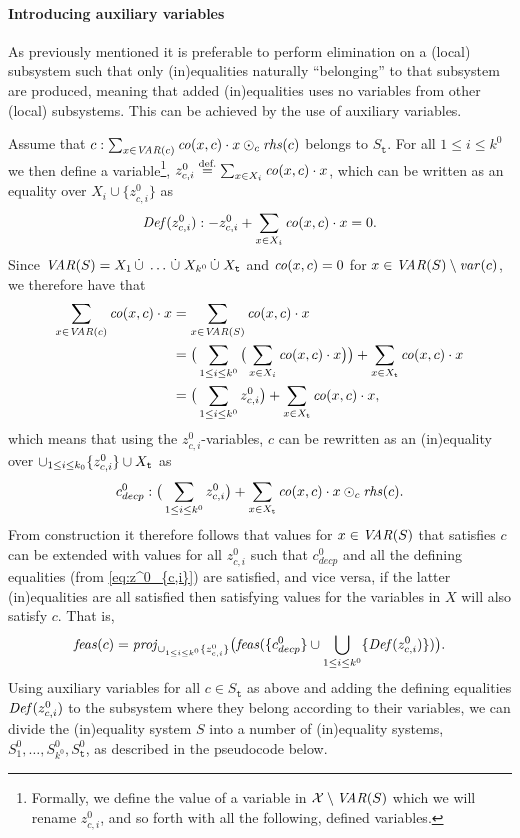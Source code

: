 \paragraph{Introducing auxiliary variables}
As previously mentioned it is preferable to perform elimination on a (local) subsystem such that only (in)equalities naturally ``belonging'' to that subsystem are produced, meaning that added (in)equalities uses no variables from other (local) subsystems. 
This can be achieved by the use of auxiliary variables.

Assume that $c:\sum_{x\in \mathit{VAR}(c)} \mathit{co}(x,c)\cdot x \odot_c \mathit{rhs}(c)$ belongs to $S_\texttt{t}$.  
For all $1\leq i \leq k^0$ we then define a variable\footnote{{Formally, we define the value of a variable in $\mathcal{X}\setminus \mathit{VAR}(S)$ which we will rename $z^0_{c,i}$, and so forth with all the following, defined variables}.}, $z_{c,i}^{0} \overset{\text{def.}}= \sum_{x\in X_i}  \mathit{co}(x,c)\cdot x$, which can be written as an equality over $X_i\cup \{z^0_{c,i}\}$ as
\begin{equation}\label{eq:z^0_{c,i}}
\mathit{Def}(z^0_{c,i}): -z_{c,i}^{0} + \sum_{x\in X_i}  \coef(x,c)\cdot x = 0.
\end{equation}
Since $\mathit{VAR}(S) = X_1 \,\dot{\cup}\; \ldots \,\dot{\cup}\; X_{k^0} \,\dot{\cup}\; X_{\texttt{t}}$ and $\mathit{co}(x,c)=0$ for $x\in \mathit{VAR}(S)\setminus \mathit{var}(c)$, we therefore have that 
\begin{align*}
\sum_{x\in \mathit{VAR}(c)} \mathit{co}(x,c)\cdot x  
&= \sum_{x\in \mathit{VAR}(S)} \mathit{co}(x,c)\cdot x \\
&= \big(\sum_{1\leq i \leq k^0}\big(\sum_{x\in X_i} \mathit{co}(x,c)\cdot x\big)\big) + \sum_{x\in X_{\texttt{t}}}\mathit{co}(x,c)\cdot x\\
&= \big(\sum_{1\leq i\leq k^0}z^0_{c,i}\big)+\sum_{x\in X_\texttt{t}}\mathit{co}(x,c)\cdot x,
\end{align*}
which means that using the $z^0_{c,i}$-variables, $c$ can be rewritten as an (in)equality over $\cup_{1\leq i\leq k_0}\{z^0_{c,i}\}\cup X_{\texttt{t}}$ as  
\begin{equation}\label{transEq}
c^0_{decp}:\big(\sum_{1\leq i \leq k^0} z_{c,i}^{0}\big) + \sum_{x\in X_\texttt{t}}\mathit{co}(x,c)\cdot x \odot_c \mathit{rhs}(c).
\end{equation}
From construction it therefore follows that values for $x\in \mathit{VAR}(S)$ that satisfies $c$ can be extended with values for all $z^0_{c,i}$ such that $c^0_{decp}$ and all the defining equalities (from \eqref{eq:z^0_{c,i}}) are satisfied, and vice versa, if the latter (in)equalities are all satisfied then satisfying values for the variables in $X$ will also satisfy $c$. That is,
\begin{equation}\label{eq:projz}
\mathit{feas}(c)=\mathit{proj}_{\cup_{1\leq i\leq k^0}\{z^0_{c,i}\}}\big(\mathit{feas}(\{c^0_{decp}\}\cup\bigcup_{1\leq i\leq k^0}\{\mathit{Def}(z^0_{c,i})\})\big).
\end{equation}
Using auxiliary variables for all $c\in S_\texttt{t}$ as above and adding the defining equalities $\mathit{Def}(z^0_{c,i})$ to the subsystem where they belong according to their variables, we can divide the (in)equality system $S$ into a number of (in)equality systems, $S^0_1,\ldots, S^0_{k^0}, S^0_\texttt{t}$, 
as described in the pseudocode below. 

